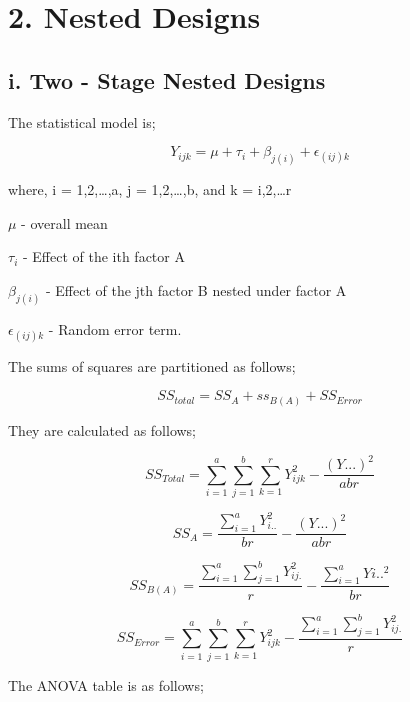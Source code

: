 \documentclass[
]{article}
\begin{document}
\hypertarget{nested-designs}{%
\section{2. Nested Designs}\label{nested-designs}}

\hypertarget{i.-two---stage-nested-designs}{%
\subsection{i. Two - Stage Nested
Designs}\label{i.-two---stage-nested-designs}}

The statistical model is;

\[Y_{ijk}=\mu+\tau_i+\beta_{j(i)}+\epsilon_{(ij)k}\]

where, i = 1,2,\ldots,a, j = 1,2,\ldots,b, and k = i,2,\ldots r

\(\mu\) - overall mean

\(\tau_i\) - Effect of the ith factor A

\(\beta_{j(i)}\) - Effect of the jth factor B nested under factor A

\(\epsilon_{(ij)k}\) - Random error term.

The sums of squares are partitioned as follows;

\[SS_{total} = SS_{A}+ss_{B(A)}+SS_{Error}\]

They are calculated as follows;

\[SS_{Total} = \sum_{i=1}^a\sum_{j=1}^b\sum_{k=1}^rY_{ijk}^2-\frac{(Y...)^2}{abr}\]

\[SS_A=\frac{\sum_{i=1}^aY_{i..}^2}{br}-\frac{(Y...)^2}{abr}\]

\[SS_{B(A)} = \frac{\sum_{i=1}^a\sum_{j=1}^bY_{ij.}^2}{r}-\frac{\sum_{i=1}^aYi..^2}{br}\]

\[SS_{Error}=\sum_{i=1}^a\sum_{j=1}^b\sum_{k=1}^rY_{ijk}^2-\frac{\sum_{i=1}^a\sum_{j=1}^bY_{ij.}^2}{r}\]

The ANOVA table is as follows;
\end{document}

